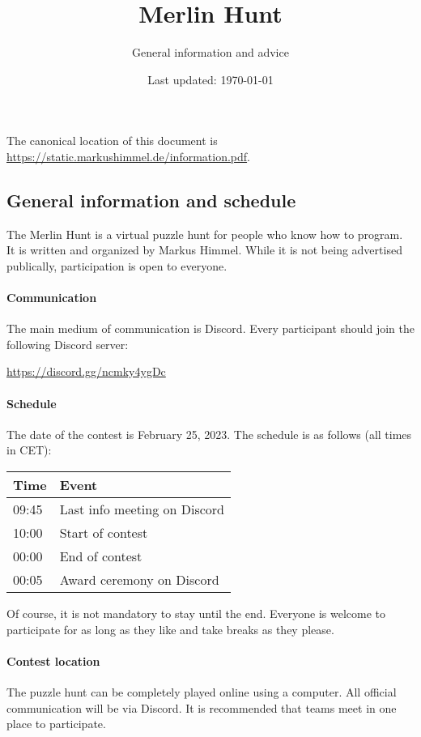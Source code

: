\documentclass[fontsize=10pt,a4paper,DIV=12,parskip=half]{scrarticle}
\title{Merlin Hunt}
\subtitle{General information and advice}
\date{Last updated: \today}
\begin{document}
\maketitle

The canonical location of this document is \url{https://static.markushimmel.de/information.pdf}.

\subsection*{General information and schedule}

The Merlin Hunt is a virtual puzzle hunt for people who know how to program.
It is written and organized by Markus Himmel. While it is not being advertised
publically, participation is open to everyone.

\paragraph{Communication} The main medium of communication is Discord. Every participant should join the following
Discord server:

\begin{center}
	\url{https://discord.gg/ncmky4ygDc}
\end{center}

\paragraph{Schedule}
The date of the contest is February 25, 2023. The schedule is as follows (all times in CET):

\begin{center}
	\begin{tabular}{@{}ll@{}}
		\toprule
		Time & Event \\ \midrule
		09:45 & Last info meeting on Discord \\
		10:00 & Start of contest \\
		00:00 & End of contest \\
		00:05 & Award ceremony on Discord \\ \bottomrule
	\end{tabular}
\end{center}

Of course, it is not mandatory to stay until the end. Everyone is welcome to
participate for as long as they like and take breaks as they please.

\paragraph{Contest location}
The puzzle hunt can be completely played online using a computer. All official
communication will be via Discord.
It is recommended that teams meet in one place to participate.
\end{document}
